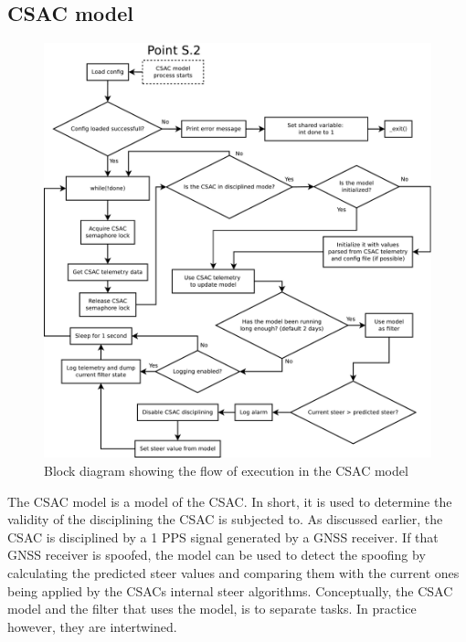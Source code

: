 \documentclass[12pt,english,a4paper]{report}
\begin{document}
\subsection{CSAC model}
\begin{figure}
\centering
  \includegraphics[angle=90, scale=0.30]{csac_filter_model.pdf}
   \caption[CSAC model execution flow block diagram]{Block diagram showing the flow of execution in the CSAC model}
   \label{csac_filter}
\end{figure}
The CSAC model is a model of the CSAC. In short, it is used to determine the validity of the disciplining the CSAC is subjected to. As discussed earlier, the CSAC is disciplined by a 1 PPS signal generated by a GNSS receiver. If that GNSS receiver is spoofed, the model can be used to detect the spoofing by calculating the predicted steer values and comparing them with the current ones being applied by the CSACs internal steer algorithms. Conceptually, the CSAC model and the filter that uses the model, is to separate tasks. In practice however, they are intertwined. 
\end{document}
